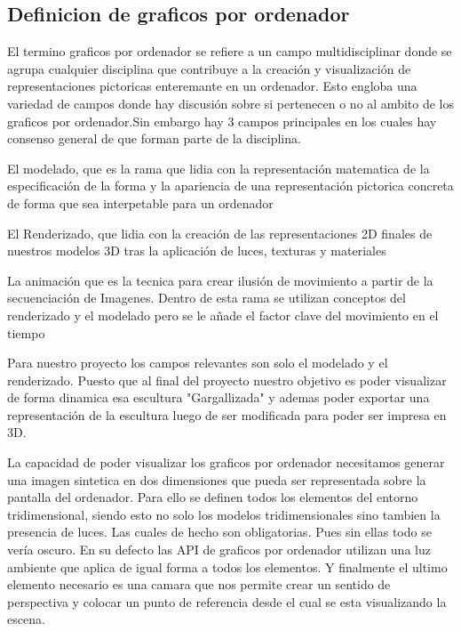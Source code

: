 \subsection{Definicion de graficos por ordenador}
El termino graficos por ordenador se refiere a un campo multidisciplinar donde se agrupa cualquier disciplina que contribuye a la creación y visualización de representaciones pictoricas enteremante en un ordenador\cite{Foley_1995}.
Esto engloba una variedad de campos donde hay discusión sobre si pertenecen o no al ambito de los graficos por ordenador.Sin embargo hay 3 campos principales en los cuales hay consenso general de que forman parte de la disciplina.
\begin{list}{.}{}
    \item El modelado, que es la rama que lidia con la representación matematica de la especificación de la forma y la apariencia de una representación pictorica concreta de forma que sea interpetable para un ordenador
    \item El Renderizado, que lidia con la creación de las representaciones 2D finales de nuestros modelos 3D tras la aplicación de luces, texturas y materiales 
    \item La animación que es la tecnica para crear ilusión de movimiento a partir de la secuenciación de Imagenes. Dentro de esta rama se utilizan conceptos del renderizado y el modelado pero se le añade el factor clave del movimiento en el tiempo
\end{list} \cite{marschner_fundamentals_2018}

Para nuestro proyecto los campos relevantes son solo el modelado y el renderizado. Puesto que al final del proyecto nuestro objetivo es poder visualizar de forma dinamica esa escultura "Gargallizada" y ademas poder exportar una representación de la escultura luego de ser modificada para poder ser impresa en 3D.

La capacidad de poder visualizar los graficos por ordenador necesitamos generar una imagen sintetica en dos dimensiones que pueda ser representada sobre la pantalla del ordenador. Para ello se definen todos los elementos del entorno tridimensional, siendo esto no solo los modelos tridimensionales sino tambien la presencia de luces. Las cuales de hecho son obligatorias. Pues sin ellas todo se vería oscuro. 
En su defecto las API de graficos por ordenador utilizan una luz ambiente que aplica de igual forma a todos los elementos. Y finalmente el ultimo elemento necesario es una camara que nos permite crear un sentido de perspectiva y colocar un punto de referencia desde el cual se esta visualizando la escena.

